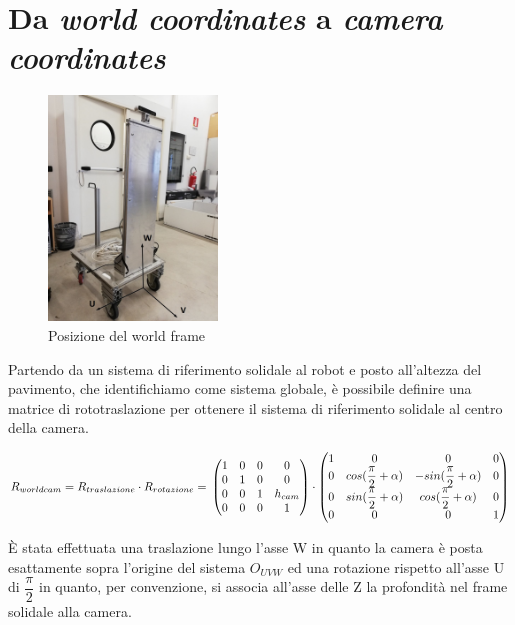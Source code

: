 \section{Da \textit{world coordinates} a \textit{camera coordinates}}
\begin{figure}[H]
	\centering
	\includegraphics[width=0.4\textwidth]{Immagini/SupportoCamera_asse1.jpg}
	\caption{Posizione del world frame}
	\label{fig:worldframe}
\end{figure}

Partendo da un sistema di riferimento solidale al robot e posto all'altezza del pavimento, che identifichiamo come sistema globale, è possibile definire una matrice di rototraslazione per ottenere il sistema di riferimento solidale al centro della camera.

\begin{equation*}
R_{worldcam} = R_{traslazione} \cdot R_{rotazione} =\\
\begin{pmatrix}
1 & 0 & 0 & 0 \\
0 & 1 & 0 & 0 \\
0 & 0 & 1 & h_{cam} \\
0 & 0 & 0 & 1 \\
\end{pmatrix} \cdot
\begin{pmatrix}
1 & 0 & 0 & 0 \\
0 & cos(\dfrac{\pi}{2}+\alpha) & -sin(\dfrac{\pi}{2}+\alpha) & 0 \\
0 & sin(\dfrac{\pi}{2}+\alpha) & cos(\dfrac{\pi}{2}+\alpha) & 0 \\
0 & 0 & 0 & 1 \\
\end{pmatrix}
\end{equation*}

È stata effettuata una traslazione lungo l'asse W in quanto la camera è posta esattamente sopra l'origine del sistema $O_{UVW}$ ed una rotazione rispetto all'asse U di $ \dfrac{\pi}{2}$ in quanto, per convenzione, si associa all'asse delle Z la profondità nel frame solidale alla camera.

